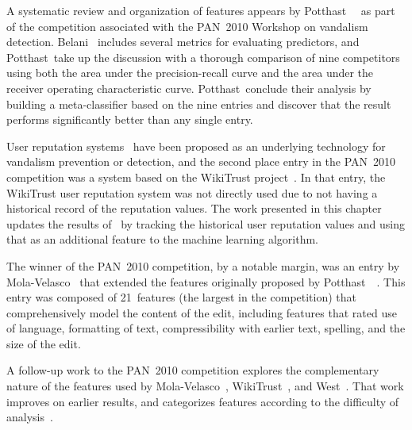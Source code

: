 A systematic review and organization of features appears
by Potthast~\etal~\cite{Potthast2010b} as part of the competition
associated with the PAN~2010 Workshop on vandalism
detection.
Belani~\cite{Belani2010} includes several metrics for evaluating
predictors, and Potthast~\etal take up the discussion with a thorough
comparison of nine competitors using both the area under the
precision-recall curve and the area under the receiver operating
characteristic curve.
Potthast~\etal conclude their analysis by building a meta-classifier
based on the nine entries and discover that the result performs
significantly better than any single entry.

User reputation systems~\cite{Zeng2006,WikiMTWtrust06,Adler2007}
have been proposed as an underlying technology for
vandalism prevention or detection, and the second place entry in
the PAN~2010 competition was a system based on the
WikiTrust project~\cite{Adler2010b}.
In that entry, the WikiTrust user reputation system was not
directly used due to not having a historical record
of the reputation values.
The work presented in this chapter updates the results of~\cite{Adler2010b} by
tracking the historical user reputation values and using that
as an additional feature to the machine learning algorithm.

The winner of the PAN~2010 competition, by a notable margin, was
an entry by Mola-Velasco~\cite{Mola2010} that extended the features
originally proposed by Potthast~\etal~\cite{Potthast2008}.
This entry was composed of 21~features (the largest in the
competition) that comprehensively model the content of the edit,
including features that rated use of language, formatting of text,
compressibility with earlier text, spelling,
and the size of the edit.

A follow-up work to the PAN~2010 competition explores the complementary
nature of the features used by Mola-Velasco~\cite{Mola2010},
WikiTrust~\cite{Adler2010b}, and West~\cite{West2010}.
That work improves on earlier results, and categorizes features
according to the difficulty of analysis~\cite{Adler2011a}.



